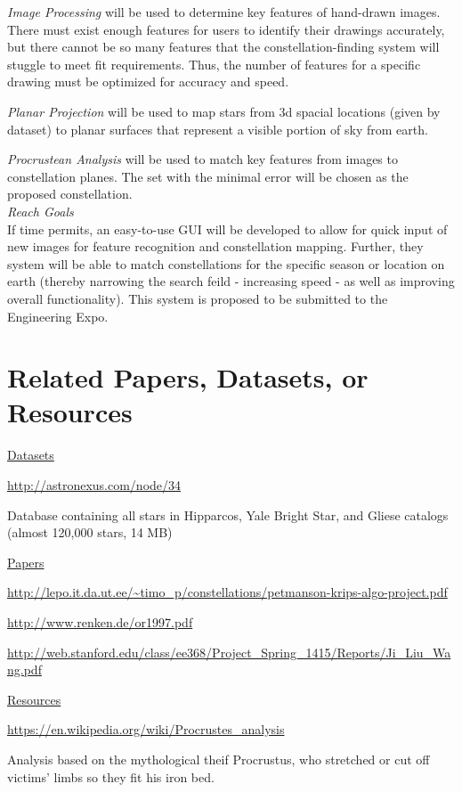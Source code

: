 \documentclass{article}
\begin{document}
\textit{Image Processing} will be used to determine key features of hand-drawn images. There must exist enough features for users to identify their drawings accurately, but there cannot be so many features that the constellation-finding system will stuggle to meet fit requirements. Thus, the number of features for a specific drawing must be optimized for accuracy and speed. \par
\textit{Planar Projection} will be used to map stars from 3d spacial locations (given by dataset) to planar surfaces that represent a visible portion of sky from earth. \par
\textit{Procrustean Analysis} will be used to match key features from images to constellation planes. The set with the minimal error will be chosen as the proposed constellation. \\
\hfill \break
\textit{Reach Goals}\\
If time permits, an easy-to-use GUI will be developed to allow for quick input of new images for feature recognition and constellation mapping. Further, they system will be able to match constellations for the specific season or location on earth (thereby narrowing the search feild - increasing speed - as well as improving overall functionality). This system is proposed to be submitted to the Engineering Expo. 


\section{Related Papers, Datasets, or Resources}


\underline{Datasets}\par
\url{http://astronexus.com/node/34}\par
Database containing all stars in Hipparcos, Yale Bright Star, and Gliese catalogs (almost 120,000 stars, 14 MB)\par

\hfill \break
\underline{Papers}\par
\url{http://lepo.it.da.ut.ee/~timo_p/constellations/petmanson-krips-algo-project.pdf}\par
\url{http://www.renken.de/or1997.pdf}\par
\url{http://web.stanford.edu/class/ee368/Project_Spring_1415/Reports/Ji_Liu_Wang.pdf}\par

\hfill \break
\underline{Resources}\par
\url{https://en.wikipedia.org/wiki/Procrustes_analysis}\par
Analysis based on the mythological theif Procrustus, who stretched or cut off victims' limbs so they fit his iron bed. \par
\end{document}
